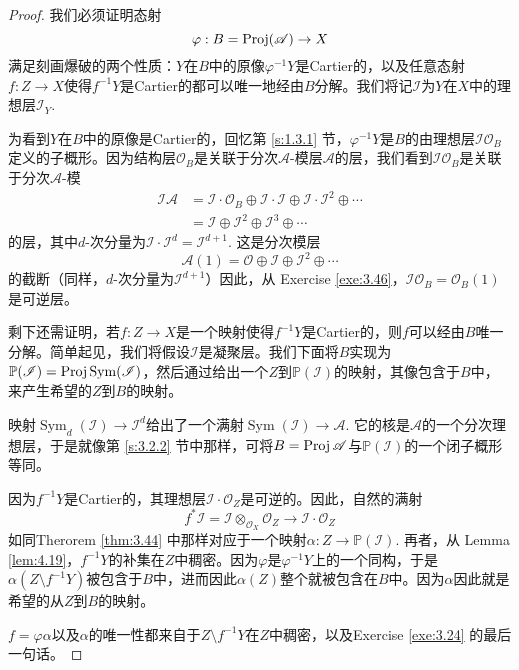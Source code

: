 \begin{proof}
	我们必须证明态射
\[
	\varphi:B=\operatorname{Proj}(\mathscr A)\to X
\]
满足刻画爆破的两个性质：$Y$在$B$中的原像$\varphi^{-1}Y$是Cartier的，以及任意态射$f:Z\to X$使得$f^{-1}Y$是Cartier的都可以唯一地经由$B$分解。我们将记$\mathscr I$为$Y$在$X$中的理想层$\mathscr I_Y$.

为看到$Y$在$B$中的原像是Cartier的，回忆第 \ref{s:1.3.1} 节，$\varphi^{-1}Y$是$B$的由理想层$\mathscr I\mathscr O_B$定义的子概形。因为结构层$\mathscr O_B$是关联于分次$\mathscr A$-模层$\mathscr A$的层，我们看到$\mathscr I\mathscr O_B$是关联于分次$\mathscr A$-模
\[
	\begin{aligned}
	\mathscr I\mathscr A&=\mathscr I\cdot \mathscr O_B\oplus \mathscr I\cdot \mathscr I\oplus \mathscr I\cdot \mathscr I^2 \oplus \cdots\\
	&=\mathscr I\oplus \mathscr I^2 \oplus \mathscr I^3\oplus \cdots
	\end{aligned}
\]
的层，其中$d$-次分量为$\mathscr I\cdot \mathscr I^d=\mathscr I^{d+1}$. 这是分次模层
\[
	\mathscr A(1)=\mathscr O\oplus \mathscr I \oplus \mathscr I^2\oplus \cdots
\]
的截断（同样，$d$-次分量为$\mathscr I^{d+1}$）因此，从 Exercise \ref{exe:3.46}，$\mathscr I\mathscr O_B=\mathscr O_B(1)$是可逆层。


剩下还需证明，若$f:Z\to X$是一个映射使得$f^{-1}Y$是Cartier的，则$f$可以经由$B$唯一分解。简单起见，我们将假设$\mathscr I$是凝聚层。我们下面将$B$实现为$\mathbb P(\mathscr I)=\operatorname{Proj} \operatorname{Sym}(\mathscr I)$，然后通过给出一个$Z$到$\mathbb P(\mathscr I)$的映射，其像包含于$B$中，来产生希望的$Z$到$B$的映射。

映射$\operatorname{Sym}_d(\mathscr I)\to \mathscr I^d$给出了一个满射$\operatorname{Sym}(\mathscr I)\to \mathscr A$. 它的核是$\mathscr A$的一个分次理想层，于是就像第 \ref{s:3.2.2} 节中那样，可将$B=\operatorname{Proj} \mathscr A$与$\mathbb P(\mathscr I)$的一个闭子概形等同。

因为$f^{-1}Y$是Cartier的，其理想层$\mathscr I\cdot \mathscr O_Z$是可逆的。因此，自然的满射
\[
	f^*\mathscr I=\mathscr I\otimes_{\mathscr O_X}\mathscr O_Z\to \mathscr I\cdot \mathscr O_Z
\]
如同Therorem \ref{thm:3.44} 中那样对应于一个映射$\alpha:Z\to \mathbb P(\mathscr I)$. 再者，从 Lemma \ref{lem:4.19}，$f^{-1}Y$的补集在$Z$中稠密。因为$\varphi$是$\varphi^{-1}Y$上的一个同构，于是$\alpha(Z\setminus f^{-1}Y)$被包含于$B$中，进而因此$\alpha(Z)$整个就被包含在$B$中。因为$\alpha$因此就是希望的从$Z$到$B$的映射。

$f=\varphi\alpha$以及$\alpha$的唯一性都来自于$Z\setminus f^{-1}Y$在$Z$中稠密，以及Exercise \ref{exe:3.24} 的最后一句话。
\end{proof}

